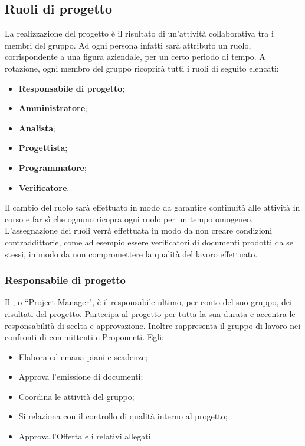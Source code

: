 \documentclass[NormeDiProgetto.tex]{subfiles}
\begin{document}
	\subsection{Ruoli di progetto}
	La realizzazione del progetto è il risultato di un'attività collaborativa tra i membri del gruppo. Ad ogni persona infatti sarà attributo un ruolo, corrispondente a una figura aziendale, per un certo periodo di tempo. A rotazione, ogni membro del gruppo ricoprirà tutti i ruoli di seguito elencati:
	\begin{itemize}
		\item \textbf{Responsabile di progetto};
		\item \textbf{Amministratore};
		\item \textbf{Analista};
		\item \textbf{Progettista};
		\item \textbf{Programmatore};
		\item \textbf{Verificatore}.
	\end{itemize}
	Il cambio del ruolo sarà effettuato in modo da garantire continuità alle attività in corso e far sì che ognuno ricopra ogni ruolo per un tempo omogeneo.\\ L'assegnazione dei ruoli verrà effettuata \respdiprog  in modo da non creare condizioni contraddittorie, come ad esempio essere verificatori di documenti prodotti da se stessi, in modo da non compromettere la qualità del lavoro effettuato.
	\subsubsection{Responsabile di progetto}
	Il \respdiprog, o \textquotedblleft Project Manager", è il responsabile ultimo, per conto del suo gruppo, dei risultati del progetto. Partecipa al progetto per tutta la sua durata e accentra le responsabilità di scelta e approvazione. Inoltre rappresenta il gruppo di lavoro nei confronti di committenti e Proponenti. Egli:
	\begin{itemize}
		\item Elabora ed emana piani e scadenze;
		\item Approva l'emissione di documenti;
		\item Coordina le attività del gruppo;
		\item Si relaziona con il controllo di qualità interno al progetto;
		\item Approva l'Offerta e i relativi allegati.
	\end{itemize}
\end{document}
